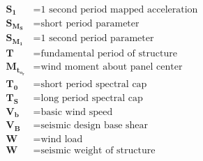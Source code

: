 \begin{align}
    \bm{S_1}     & = \textrm{1 second period mapped acceleration}     \\
    \bm{S_M_S}   & = \textrm{short period parameter}                  \\
    \bm{S_M_1}   & = \textrm{1 second period parameter}               \\
    \bm{T}       & = \textrm{fundamental period of structure}         \\
    \bm{M_t_o_r} & = \textrm{wind moment about panel center }         \\
    \bm{T_0}     & = \textrm{short period spectral cap }              \\
    \bm{T_S}     & = \textrm{long period spectral cap}                \\
    \bm{V_b}     & = \textrm{basic wind speed}                        \\
    \bm{V_B}     & = \textrm{seismic design base shear}               \\
    \bm{W}       & = \textrm{wind load}                               \\
    \bm{W}       & = \textrm{seismic weight of structure }            \\
\end{align}
